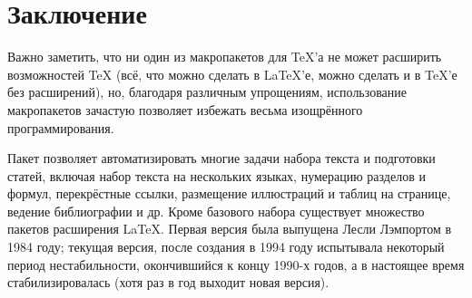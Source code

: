 \documentclass[14pt,a4paper,oneside]{article}
\begin{document}
\section{Заключение}
Важно заметить, что ни один из макропакетов для TeX’а не может расширить возможностей TeX (всё, что можно сделать в LaTeX’е, можно сделать и в TeX’е без расширений), но, благодаря различным упрощениям, использование макропакетов зачастую позволяет избежать весьма изощрённого программирования.

Пакет позволяет автоматизировать многие задачи набора текста и подготовки статей, включая набор текста на нескольких языках, нумерацию разделов и формул, перекрёстные ссылки, размещение иллюстраций и таблиц на странице, ведение библиографии и др. Кроме базового набора существует множество пакетов расширения LaTeX. Первая версия была выпущена Лесли Лэмпортом в 1984 году; текущая версия, после создания в 1994 году испытывала некоторый период нестабильности, окончившийся к концу 1990-х годов, а в настоящее время стабилизировалась (хотя раз в год выходит новая версия).
\newpage
\end{document}
